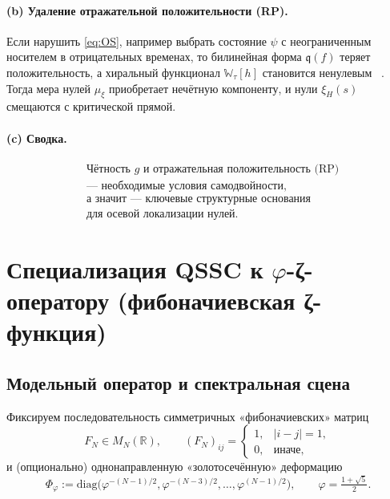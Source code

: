 \documentclass{article}
\numberwithin{equation}{section}
\theoremstyle{plain}
\theoremstyle{definition}
\theoremstyle{remark}
\begin{document}
\paragraph{(b) Удаление отражательной положительности (RP).}
Если нарушить \eqref{eq:OS}, например выбрать состояние $\psi$ с неограниченным носителем в отрицательных временах,  
то билинейная форма $\mathfrak q(f)$ теряет положительность, а хиральный функционал $\mathbb W_\tau[h]$ становится ненулевым ~\cite{Jaffe2007}.  
Тогда мера нулей $\mu_\xi$ приобретает нечётную компоненту, и нули $\xi_H(s)$ смещаются с критической прямой.  

\paragraph{(c) Сводка.}
\begin{equation}
	\boxed{
		\begin{aligned}
			&\text{Чётность $g$ и отражательная положительность (RP)}\\
			&\text{— необходимые условия самодвойности,}\\
			&\text{а значит — ключевые структурные основания}\\
			&\text{для осевой локализации нулей.}
		\end{aligned}
	}
\end{equation}


\clearpage

\section{Специализация QSSC к \texorpdfstring{$\varphi$}{φ}-ζ-оператору (фибоначиевская ζ-функция)}

\subsection*{Модельный оператор и спектральная сцена}

Фиксируем последовательность симметричных «фибоначиевских» матриц
\begin{equation}\label{eq:G-FN}
F_N \in M_N(\mathbb R),\qquad
(F_N)_{ij}=
\begin{cases}
1,& |i-j|=1,\\
0,& \text{иначе},
\end{cases}
\end{equation}
и (опционально) однонаправленную «золотосечённую» деформацию
\begin{equation}\label{eq:G-Phi-deform}
\Phi_\varphi:=\mathrm{diag}\big(\varphi^{-(N-1)/2},\varphi^{-(N-3)/2},\dots,\varphi^{(N-1)/2}\big),
\qquad 
\varphi=\tfrac{1+\sqrt5}{2}.
\end{equation}
\end{document}
